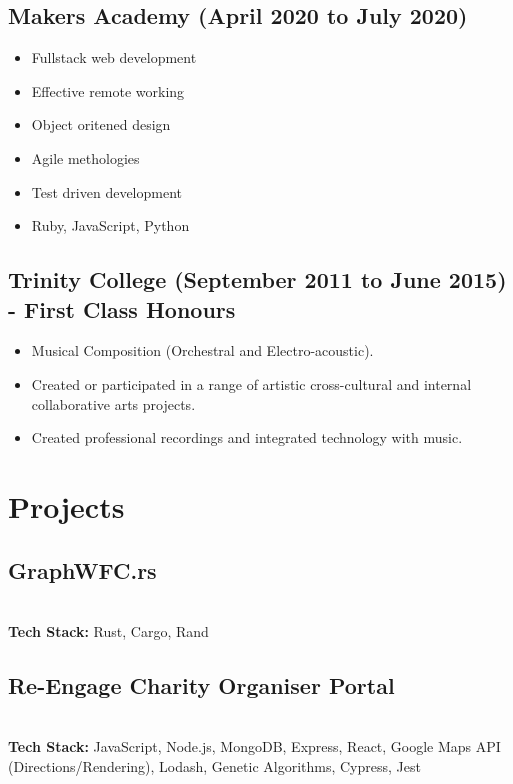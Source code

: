 \documentclass[12pt]{IEEEtran}
\begin{document}
\subsection*{Makers Academy (April 2020 to July 2020)}

\begin{itemize}
\item Fullstack web development
\item Effective remote working
\item Object oritened design
\item Agile methologies
\item Test driven development
\item Ruby, JavaScript, Python
\end{itemize}

\subsection*{Trinity College (September 2011 to June 2015) - First Class Honours}
\begin{itemize}
\item Musical Composition (Orchestral and Electro-acoustic).
\item Created or participated in a range of artistic cross-cultural and internal collaborative arts projects.
\item Created professional recordings and integrated technology with music.
\end{itemize}

\vskip 1in
\lipsum[1-2]
\vfill\null
\columnbreak

\section*{\textbf{Projects}}
\subsection*{GraphWFC.rs}
 \\[5pt]
\textbf{Tech Stack:} Rust, Cargo, Rand

\subsection*{Re-Engage Charity Organiser Portal}
 \\[5pt]
\textbf{Tech Stack:} JavaScript, Node.js, MongoDB, Express, React, Google Maps API (Directions/Rendering), Lodash, Genetic Algorithms, Cypress, Jest
\end{document}
